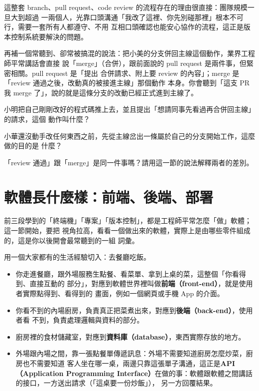 
這整套 branch、pull request、code review 的流程存在的理由很直接：團隊規模一旦大到超過
一兩個人，光靠口頭溝通「我改了這裡、你先別碰那裡」根本不可行，需要一套所有人都遵守、不用
互相口頭確認也能安心協作的流程，這正是版本控制系統要解決的問題。

再補一個常聽到、卻常被搞混的說法：把小美的分支併回主線這個動作，業界工程師平常講話會直接
說「merge」（合併），跟前面說的 pull request 是兩件事，但緊密相關。pull request 是「提出
合併請求、附上要 review 的內容」；merge 是「review 通過之後，改動真的被接進主線」那個動作
本身。你會聽到「這支 PR 我 merge 了」，說的就是這條分支的改動已經正式進到主線了。

\begin{drills}[label=drills:version-control]
\item 小明把自己剛剛改好的程式碼推上去，並且提出「想請同事先看過再合併回主線」的請求，這個
動作叫什麼？
\item 小華還沒動手改任何東西之前，先從主線岔出一條屬於自己的分支開始工作，這麼做的目的是
什麼？
\item 「review 通過」跟「merge」是同一件事嗎？請用這一節的說法解釋兩者的差別。
\end{drills}

\section{軟體長什麼樣：前端、後端、部署}
\label{sec:software-anatomy}

前三段學到的「終端機」「專案」「版本控制」，都是工程師平常怎麼「做」軟體；這一節開始，要把
視角拉高，看看一個做出來的軟體，實際上是由哪些零件組成的，這是你以後開會最常聽到的一組
詞彙。

用一個大家都有的生活經驗切入：去餐廳吃飯。

\begin{itemize}
\item 你走進餐廳，跟外場服務生點餐、看菜單、拿到上桌的菜，這整個「你看得到、直接互動的
部分」，對應到軟體世界裡叫做\textbf{前端（front-end）}，就是使用者實際點得到、看得到的
畫面，例如一個網頁或手機 App 的介面。
\item 你看不到的內場廚房，負責真正把菜煮出來，對應到\textbf{後端（back-end）}，使用者看
不到，負責處理邏輯與資料的部分。
\item 廚房裡的食材儲藏室，對應到\textbf{資料庫（database）}，東西實際存放的地方。
\item 外場跟內場之間，靠一張點餐單傳遞訊息：外場不需要知道廚房怎麼炒菜，廚房也不需要知道
客人坐在哪一桌，兩邊只靠這張單子溝通，這正是\textbf{API（Application Programming
Interface）}在做的事：軟體跟軟體之間講話的接口，一方送出請求（「這桌要一份炒飯」），
另一方回覆結果。
\end{itemize}

